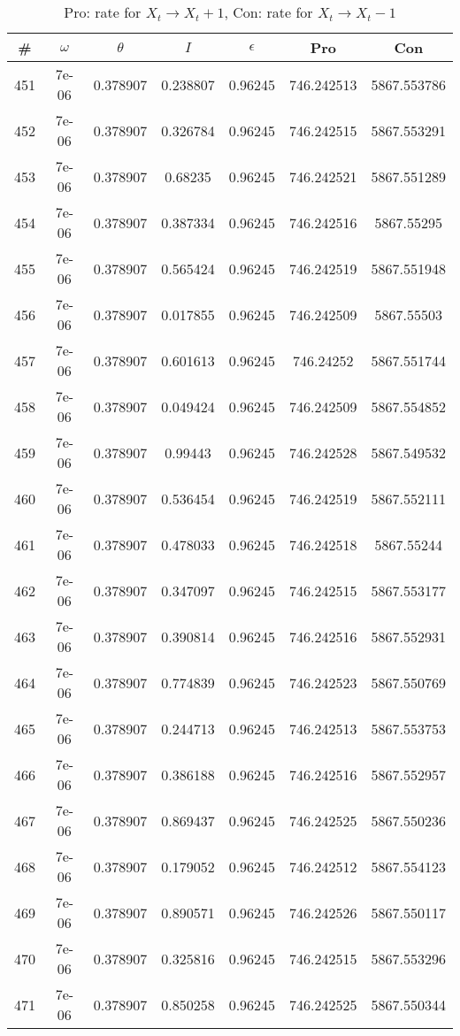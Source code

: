 \newpage
\begin{table}
\caption{Pro: rate for $X_t \rightarrow X_t + 1$, Con: rate for $X_t \rightarrow X_t - 1$}
\begin{tabular*}{\linewidth}{c|c|c|c|c|c|c}
\# & $\omega$ & $\theta$ & $I$ & $\epsilon$ & Pro & Con \\
\hline
451 & 7e-06 & 0.378907 & 0.238807 & 0.96245 & 746.242513 & 5867.553786\\
452 & 7e-06 & 0.378907 & 0.326784 & 0.96245 & 746.242515 & 5867.553291\\
453 & 7e-06 & 0.378907 & 0.68235 & 0.96245 & 746.242521 & 5867.551289\\
454 & 7e-06 & 0.378907 & 0.387334 & 0.96245 & 746.242516 & 5867.55295\\
455 & 7e-06 & 0.378907 & 0.565424 & 0.96245 & 746.242519 & 5867.551948\\
456 & 7e-06 & 0.378907 & 0.017855 & 0.96245 & 746.242509 & 5867.55503\\
457 & 7e-06 & 0.378907 & 0.601613 & 0.96245 & 746.24252 & 5867.551744\\
458 & 7e-06 & 0.378907 & 0.049424 & 0.96245 & 746.242509 & 5867.554852\\
459 & 7e-06 & 0.378907 & 0.99443 & 0.96245 & 746.242528 & 5867.549532\\
460 & 7e-06 & 0.378907 & 0.536454 & 0.96245 & 746.242519 & 5867.552111\\
461 & 7e-06 & 0.378907 & 0.478033 & 0.96245 & 746.242518 & 5867.55244\\
462 & 7e-06 & 0.378907 & 0.347097 & 0.96245 & 746.242515 & 5867.553177\\
463 & 7e-06 & 0.378907 & 0.390814 & 0.96245 & 746.242516 & 5867.552931\\
464 & 7e-06 & 0.378907 & 0.774839 & 0.96245 & 746.242523 & 5867.550769\\
465 & 7e-06 & 0.378907 & 0.244713 & 0.96245 & 746.242513 & 5867.553753\\
466 & 7e-06 & 0.378907 & 0.386188 & 0.96245 & 746.242516 & 5867.552957\\
467 & 7e-06 & 0.378907 & 0.869437 & 0.96245 & 746.242525 & 5867.550236\\
468 & 7e-06 & 0.378907 & 0.179052 & 0.96245 & 746.242512 & 5867.554123\\
469 & 7e-06 & 0.378907 & 0.890571 & 0.96245 & 746.242526 & 5867.550117\\
470 & 7e-06 & 0.378907 & 0.325816 & 0.96245 & 746.242515 & 5867.553296\\
471 & 7e-06 & 0.378907 & 0.850258 & 0.96245 & 746.242525 & 5867.550344\\

\end{tabular*}
\end{table}
